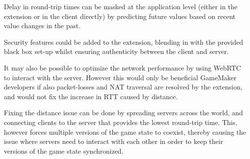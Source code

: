 \documentclass[bsc, 12pt, twoside, singlespacing, parskip, abbrevs, notimes, normalheadings, logo, deptreport]{styles/infthesis}
\begin{document}
Delay in round-trip times can be masked at the application level (either in the extension or in the client directly) by predicting future values based on recent value changes in the past.

Security features could be added to the extension, blending in with the provided black box set-up whilst ensuring authenticity between the client and server.

It may also be possible to optimize the network performance by using WebRTC to interact with the server. However this would only be beneficial GameMaker developers if also packet-losses and NAT traversal are resolved by the extension, and would not fix the increase in RTT caused by distance.

Fixing the distance issue can be done by spreading servers across the world, and connecting clients to the server that provides the lowest round-trip time. This, however forces multiple versions of the game state to coexist, thereby causing the issue where servers need to interact with each other in order to keep their versions of the game state synchronized.







\end{document}
